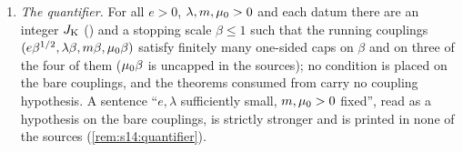 \begin{lemma}
\begin{enumerate}[label=\textup{(\alph*)},leftmargin=*]
\item \emph{The quantifier.} For all $e>0$, $\lambda,m,\mu_0>0$ and each datum there are an integer $J_{\rm K}$ (\cite[Thm.~3.1]{K1}) and a stopping scale $\beta\le1$ such that the running couplings $(e\beta^{1/2},\lambda\beta,m\beta,\mu_0\beta)$ satisfy finitely many one-sided caps on $\beta$ and on three of the four of them ($\mu_0\beta$ is uncapped in the sources); no condition is placed on the bare couplings, and the theorems consumed from \cite{K1,K2} carry no coupling hypothesis. A sentence ``$e,\lambda$ sufficiently small, $m,\mu_0>0$ fixed'', read as a hypothesis on the bare couplings, is strictly stronger and is printed in none of the sources (\cref{rem:s14:quantifier}).
\end{enumerate}
\end{lemma}

